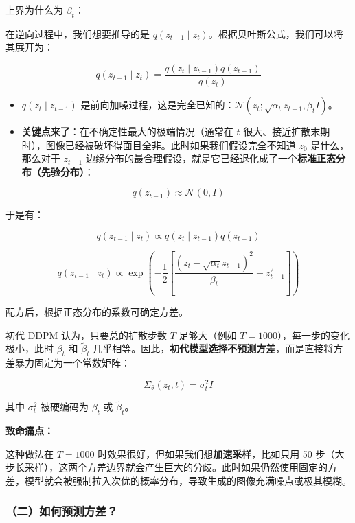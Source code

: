 上界为什么为 \(\beta_t\)：

在逆向过程中，我们想要推导的是 \(q(z_{t-1}\mid z_t)\)。根据贝叶斯公式，我们可以将其展开为：

\[
q(z_{t-1}\mid z_t)=\frac{q(z_t\mid z_{t-1})q(z_{t-1})}{q(z_t)}
\]

\begin{itemize}
\tightlist
\item
  \(q(z_t\mid z_{t-1})\) 是前向加噪过程，这是完全已知的：\(\mathcal{N}(z_t;\sqrt{\alpha_t}z_{t-1},\beta_t I)\)。
\item
{}
  \textbf{关键点来了}：在不确定性最大的极端情况（通常在 \(t\) 很大、接近扩散末期时），图像已经被破坏得面目全非。此时如果我们假设完全不知道 \(z_0\) 是什么，那么对于 \(z_{t-1}\) 边缘分布的最合理假设，就是它已经退化成了一个\textbf{标准正态分布（先验分布）}：
\end{itemize}

\[
q(z_{t-1})\approx\mathcal{N}(0,I)
\]

于是有：

\[
q(z_{t-1}\mid z_t)\propto q(z_t\mid z_{t-1})q(z_{t-1})
\]

\[
q(z_{t-1}\mid z_t)\propto \exp\left(-\frac{1}{2}\left[\frac{(z_t-\sqrt{\alpha_t}z_{t-1})^2}{\beta_t}+z_{t-1}^2\right]\right)
\]

配方后，根据正态分布的系数可确定方差。

初代 DDPM 认为，只要总的扩散步数 \(T\) 足够大（例如 \(T=1000\)），每一步的变化极小，此时 \(\beta_t\) 和 \(\tilde{\beta}_t\) 几乎相等。因此，\textbf{初代模型选择不预测方差}，而是直接将方差暴力固定为一个常数矩阵：

\[
\Sigma_\theta(z_t,t)=\sigma_t^2 I
\]

其中 \(\sigma_t^2\) 被硬编码为 \(\beta_t\) 或 \(\tilde{\beta}_t\)。

\textbf{致命痛点：}

这种做法在 \(T=1000\) 时效果很好，但如果我们想\textbf{加速采样}，比如只用 50 步（大步长采样），这两个方差边界就会产生巨大的分歧。此时如果仍然使用固定的方差，模型就会被强制拉入次优的概率分布，导致生成的图像充满噪点或极其模糊。

\hypertarget{ux4e8cux5982ux4f55ux9884ux6d4bux65b9ux5dee}{%
\subsubsection{（二）如何预测方差？}\label{ux4e8cux5982ux4f55ux9884ux6d4bux65b9ux5dee}}

